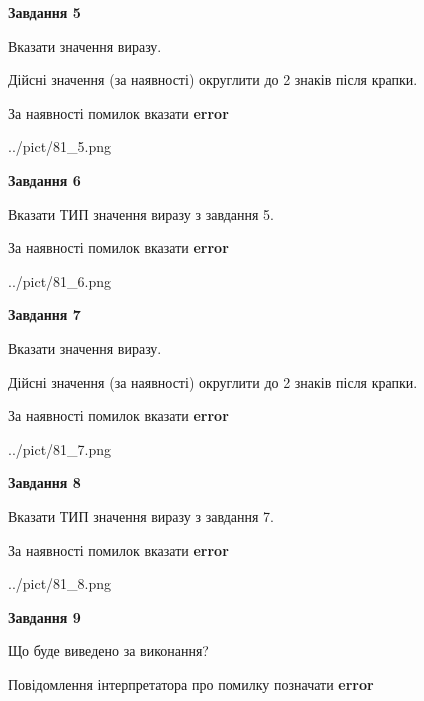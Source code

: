 \documentclass[11pt, ukrainian]{article}
\begin{document}
{\begin {large}
{\begin {center}\textbf{Завдання 5}\end {center}}\par
Вказати значення виразу. \par
Дійсні значення (за наявності) округлити до 2 знаків після крапки. \par
За наявності помилок вказати \textbf{error}

\begin{center}
	{../pict/81_5.png}
\end{center}
\newpage

{\begin {center}\textbf{Завдання 6}\end {center}}\par
Вказати ТИП значення виразу з завдання 5. \par
За наявності помилок вказати \textbf{error}

\begin{center}
	{../pict/81_6.png}
\end{center}
\newpage

{\begin {center}\textbf{Завдання 7}\end {center}}\par
Вказати значення виразу. \par
Дійсні значення (за наявності) округлити до 2 знаків після крапки. \par
За наявності помилок вказати \textbf{error}

\begin{center}
	{../pict/81_7.png}
\end{center}
\newpage

{\begin {center}\textbf{Завдання 8}\end {center}}\par
Вказати ТИП значення виразу з завдання 7. \par
За наявності помилок вказати \textbf{error}

\begin{center}
	{../pict/81_8.png}
\end{center}
\newpage

{\begin {center}\textbf{Завдання 9}\end {center}}\par
Що буде виведено за виконання? \par
Повідомлення інтерпретатора про помилку позначати \textbf{error}


\end{large}}
\end{document}

